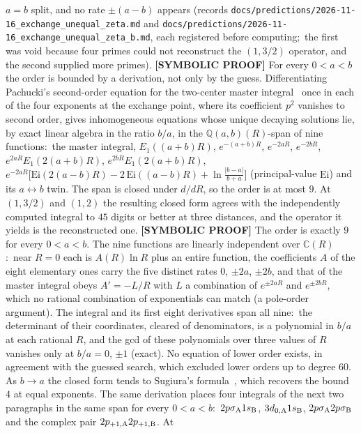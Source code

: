 \documentclass[aps,pra,twocolumn,superscriptaddress,longbibliography]{revtex4-2}
\begin{document}
$a=b$ split, and no rate $\pm(a-b)$ appears (records
\texttt{docs/predictions/2026-11-16\_exchange\_unequal\_zeta.md} and
\texttt{docs/predictions/2026-11-16\_exchange\_unequal\_zeta\_b.md}, each registered before
computing;\ the first was void because four primes could not reconstruct the $(1,3/2)$
operator, and the second supplied more primes).
\textbf{[SYMBOLIC PROOF]} For every $0<a<b$ the order is bounded by a derivation, not
only by the guess.  Differentiating Pachucki's second-order equation for the two-center master
integral~\cite{pachucki2009} once in each of the four exponents at the exchange point, where its
coefficient $p^2$ vanishes to second order, gives inhomogeneous equations whose unique decaying
solutions lie, by exact linear algebra in the ratio $b/a$, in the $\mathbb{Q}(a,b)(R)$-span of nine functions:\ the master
integral, $E_1((a+b)R)$, $e^{-(a+b)R}$, $e^{-2aR}$, $e^{-2bR}$, $e^{2aR}E_1(2(a+b)R)$,
$e^{2bR}E_1(2(a+b)R)$,
$e^{-2aR}\bigl[\mathrm{Ei}(2(a-b)R)-2\,\mathrm{Ei}((a-b)R)+\ln\tfrac{|b-a|}{b+a}\bigr]$ (principal-value $\mathrm{Ei}$) and its
$a\leftrightarrow b$ twin.  The span is closed under $d/dR$, so the order is at most $9$.  At
$(1,3/2)$ and $(1,2)$ the resulting closed form agrees with the independently computed integral
to $45$ digits or better at three distances, and the operator it yields is the reconstructed one.
\textbf{[SYMBOLIC PROOF]} The order is exactly $9$ for every $0<a<b$.  The nine functions are
linearly independent over $\mathbb{C}(R)$:\ near $R=0$ each is $A(R)\ln R$ plus an entire function, the
coefficients $A$ of the eight elementary ones carry the five distinct rates $0$, $\pm2a$, $\pm2b$, and
that of the master integral obeys $A'=-L/R$ with $L$ a combination of $e^{\pm2aR}$ and $e^{\pm2bR}$,
which no rational combination of exponentials can match (a pole-order argument).  The integral and
its first eight derivatives span all nine:\ the determinant of their coordinates, cleared of
denominators, is a polynomial in $b/a$ at each rational $R$, and the gcd of these polynomials over
three values of $R$ vanishes only at $b/a=0$, $\pm1$ (exact).  No equation of lower order exists, in agreement with the guessed
search, which excluded lower orders up to degree $60$.  As $b\to a$ the
closed form tends to Sugiura's formula~\cite{sugiura1927}, which recovers the bound $4$ at equal
exponents.  The same derivation places four integrals of the next two paragraphs in the same span
for every $0<a<b$:\ $2p\sigma_{\rm A}1s_{\rm B}$, $3d_{0,{\rm A}}1s_{\rm B}$,
$2p\sigma_{\rm A}2p\sigma_{\rm B}$ and the complex pair $2p_{+1,{\rm A}}2p_{+1,{\rm B}}$.  At
\end{document}

